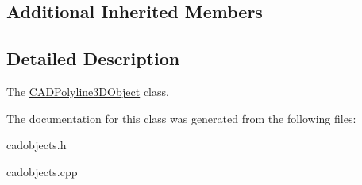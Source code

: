 \subsection*{Additional Inherited Members}


\subsection{Detailed Description}
The \hyperlink{class_c_a_d_polyline3_d_object}{C\+A\+D\+Polyline3\+D\+Object} class. 

The documentation for this class was generated from the following files\+:\begin{DoxyCompactItemize}
\item 
cadobjects.\+h\item 
cadobjects.\+cpp\end{DoxyCompactItemize}
